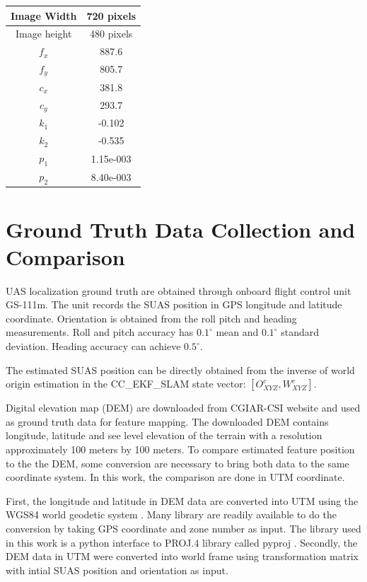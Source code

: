 \begin{center}
\begin{tabular}{|c|c|}
\hline
Image Width & 720 pixels \\ \hline
Image height & 480 pixels\\ \hline
$f_x$ & 887.6\\ \hline
$f_y$ & 805.7\\ \hline
$c_x$ & 381.8 \\ \hline
$c_y$ & 293.7 \\ \hline
$k_1$ & -0.102 \\ \hline
$k_2$ & -0.535 \\ \hline
$p_1$ & 1.15e-003 \\ \hline
$p_2$ & 8.40e-003 \\
\hline
\end{tabular}
\end{center}

\section{Ground Truth Data Collection and Comparison}

UAS localization ground truth are obtained through onboard flight
control unit GS-111m. The unit records the SUAS position in GPS
longitude and latitude coordinate. Orientation is obtained from the
roll pitch and heading measurements. Roll and pitch accuracy has
$0.1^\circ$ mean and $0.1^\circ$ standard deviation. Heading accuracy can
achieve $0.5^\circ$.\cite{_athena_????}

The estimated SUAS position can be directly obtained from the inverse
of world origin estimation in the CC\_EKF\_SLAM state vector:
$[O_{XYZ}^{c}, W_{XYZ}^{c}]$.

Digital elevation map (DEM) are downloaded from CGIAR-CSI website
\cite{_cgiar-csi_????} and used as ground truth data for feature
mapping. The downloaded DEM contains longitude, latitude and see level
elevation of the terrain with a resolution approximately 100 meters by
100 meters. To compare estimated feature position to the the DEM, some
conversion are necessary to bring both data to the same coordinate
system. In this work, the comparison are done in UTM coordinate. 

First, the longitude and latitude in DEM data are converted into UTM
using the WGS84 world geodetic system \cite{_world_????}. Many library
are readily available to do the conversion by taking GPS coordinate
and zone number as input. The library used in this work is a python
interface to PROJ.4 library \cite{_pyproj_????} called pyproj
\cite{_pyproj_????}. Secondly, the DEM data in UTM were converted into
world frame using transformation matrix with intial SUAS position and
orientation as input.


